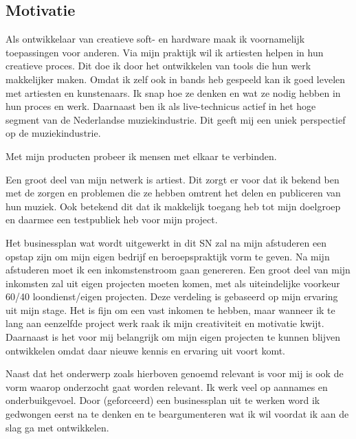 \subsection{Motivatie}
Als ontwikkelaar van creatieve soft- en hardware maak ik voornamelijk toepassingen voor anderen. Via mijn praktijk wil ik artiesten helpen in hun creatieve proces. Dit doe ik door het ontwikkelen van tools die hun werk makkelijker maken. Omdat ik zelf ook in bands heb gespeeld kan ik goed levelen met artiesten en kunstenaars. Ik snap hoe ze denken en wat ze nodig hebben in hun proces en werk. Daarnaast ben ik als live-technicus actief in het hoge segment van de Nederlandse muziekindustrie. Dit geeft mij een uniek perspectief op de muziekindustrie.

Met mijn producten probeer ik mensen met elkaar te verbinden.

Een groot deel van mijn netwerk is artiest. Dit zorgt er voor dat ik bekend ben met de zorgen en problemen die ze hebben omtrent het delen en publiceren van hun muziek. Ook betekend dit dat ik makkelijk toegang heb tot mijn doelgroep en daarmee een testpubliek heb voor mijn project.

Het businessplan wat wordt uitgewerkt in dit SN zal na mijn afstuderen een opstap zijn om mijn eigen bedrijf en beroepspraktijk vorm te geven. Na mijn afstuderen moet ik een inkomstenstroom gaan genereren. Een groot deel van mijn inkomsten zal uit eigen projecten moeten komen, met als uiteindelijke voorkeur 60/40 loondienst/eigen projecten. Deze verdeling is gebaseerd op mijn ervaring uit mijn stage. Het is fijn om een vast inkomen te hebben, maar wanneer ik te lang aan eenzelfde project werk raak ik mijn creativiteit en motivatie kwijt. Daarnaast is het voor mij belangrijk om mijn eigen projecten te kunnen blijven ontwikkelen omdat daar nieuwe kennis en ervaring uit voort komt.

Naast dat het onderwerp zoals hierboven genoemd relevant is voor mij is ook de vorm waarop onderzocht gaat worden relevant. Ik werk veel op aannames en onderbuikgevoel. Door (geforceerd) een businessplan uit te werken word ik gedwongen eerst na te denken en te beargumenteren wat ik wil voordat ik aan de slag ga met ontwikkelen.


